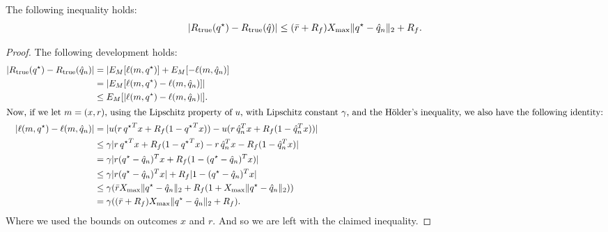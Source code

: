 \begin{claim}
\label{claim1}
 The following inequality holds:
\begin{equation*}
  |R_{\mathrm{true}}({q^\star}) - R_{\mathrm{true}}(\hat q)| \leq (\bar r +R_f)X_{\max}\|{q^\star} - {\hat q}_n\|_2 + R_f.
\end{equation*}
\end{claim}

\begin{proof}
The following development holds:
\begin{align*}
  |R_{\mathrm{true}}({q^\star}) - R_{\mathrm{true}}({\hat q}_n)| &= |E_M[\ell(m,{q^\star})] + E_M[-\ell(m,{\hat q}_n)]\\
                                           & = |E_M[\ell(m,{q^\star}) - \ell(m,{\hat q}_n)]|\\
                                           & \leq E_M[|\ell(m,{q^\star}) - \ell(m,{\hat q}_n)|].\\
  \intertext{Now, if we let $m=(x,r)$, using the Lipschitz property of $u$, with Lipschitz constant 
  $\gamma$, and the Hölder's inequality, we also have the following identity:}
  |\ell(m,{q^\star}) - \ell(m,{\hat q}_n)| &= |u(r\,{q^\star}^Tx + R_f(1-{q^\star}^{T}x)) - u(r\,{\hat q}_n^Tx + R_f(1-{\hat q}_n^{T}x))| \\
                                           & \leq \gamma|r\,{q^\star}^Tx + R_f(1-{q^\star}^Tx) - r\,{\hat q}_n^Tx - R_f(1-{\hat q}_n^Tx)|\\
                                           & = \gamma|r({q^\star}-{\hat q}_n)^Tx + R_f(1-({q^\star}-{\hat q}_n)^Tx)|\\
                                           & \leq \gamma|r({q^\star}-{\hat q}_n)^Tx| + R_f|1-({q^\star}-{\hat q}_n)^Tx|\\
                                           & \leq \gamma(\bar rX_{\max} \|{q^\star}-{\hat q}_n\|_2 + R_f(1+X_{\max} \|{q^\star}-{\hat q}_n\|_2))\\
                                           & = \gamma((\bar r + R_f)X_{\max} \|{q^\star} - {\hat q}_n\|_2 + R_f).
\end{align*}
Where we used the bounds on outcomes $x$ and $r$. And so we are left with the claimed
inequality. 
\end{proof}


